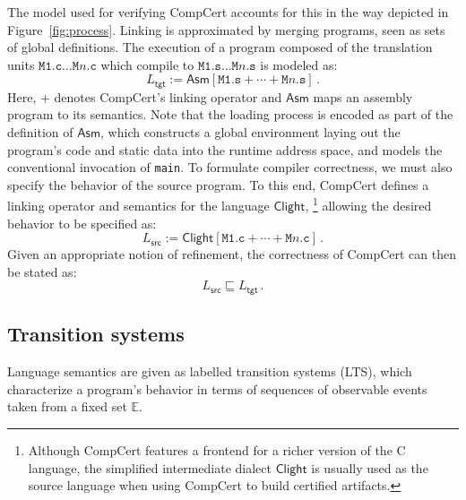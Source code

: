 \documentclass[11pt,oneside,draft]{book}
\theoremstyle{definition}
\newcommand{\kw}[1]{\ensuremath{ \mathsf{#1} }}
\newcommand{\refby}{\sqsubseteq} %
\begin{document}
The model used for verifying CompCert accounts for this
in the way depicted in Figure~\ref{fig:process}.
Linking is approximated by
merging programs, seen as sets of global definitions.
The execution
of a program composed of the translation units
$\texttt{M1.c} \ldots \texttt{M$n$.c}$
which compile to
$\texttt{M1.s} \ldots \texttt{M$n$.s}$
is modeled as:
\[
    L_\kw{tgt} :=
    \kw{Asm}[\texttt{M1.s} +
             \cdots +
             \texttt{M$n$.s}] \,.
\]
Here,
$+$ denotes CompCert's linking operator and
$\kw{Asm}$ maps an assembly program to its semantics.
Note that the loading process is encoded
as part of the definition of $\kw{Asm}$,
which constructs a global environment
laying out the program's code and static data
into the runtime address space,
and models the conventional invocation of \texttt{main}.
To formulate compiler correctness,
we must also specify the behavior of the source program.
To this end,
CompCert defines a linking operator
and semantics
for the language $\kw{Clight}$,%
\footnote{
  Although CompCert features a frontend for a richer version
  of the C language,
  the simplified intermediate dialect \kw{Clight}
  is usually used as the source language
  when using CompCert to build certified artifacts.
}
allowing the desired behavior to be specified as:
\[
    L_\kw{src} :=
    \kw{Clight}[\texttt{M1.c} + \cdots + \texttt{M$n$.c}] \,.
\]
Given an appropriate notion of refinement,
the correctness of CompCert
can then be stated as:
\[
  L_\kw{src} \refby L_\kw{tgt}
  \,.
\]


\subsection{Transition systems} %

Language semantics are
given as labelled transition systems (LTS),
which characterize a program's behavior in terms of
sequences of observable events
taken from a fixed set $\mathbb{E}$.
\end{document}
